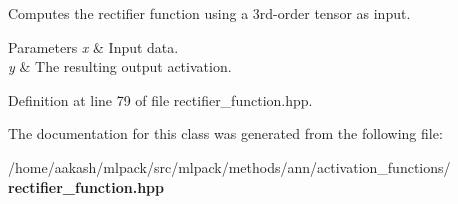 Computes the rectifier function using a 3rd-\/order tensor as input. 


\begin{DoxyParams}{Parameters}
{\em x} & Input data. \\
\hline
{\em y} & The resulting output activation. \\
\hline
\end{DoxyParams}


Definition at line 79 of file rectifier\+\_\+function.\+hpp.



The documentation for this class was generated from the following file\+:\begin{DoxyCompactItemize}
\item 
/home/aakash/mlpack/src/mlpack/methods/ann/activation\+\_\+functions/\textbf{ rectifier\+\_\+function.\+hpp}\end{DoxyCompactItemize}
